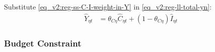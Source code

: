 \documentclass[../thesis.tex]{subfiles}
\begin{document}
Substitute \ref{eq_v2:reg-ss-C-I-weight-in-Y} in \ref{eq_v2:reg-ll-total-yn}:
\begin{align}
	\hat{Y}_{\eta t} &= \theta_{C\eta} \hat{C}_{\eta t} + (1 - \theta_{C\eta}) \hat{I}_{\eta t} \label{eq_v2:reg-ll-total-yn-2}
\end{align}

\begin{comment}
	Log-linearize \ref{eq_v2:reg-regional-demand} and then substitute \ref{eq_v2:reg-total-expense-level-2-ll}:
	\begin{align}
		P_{\eta t} Y_{\eta t} &= Q_{\eta t} C_{\eta t} + B_{\eta t} \tag{\ref{eq_v2:reg-regional-demand}} \implies \\
		\hat{P}_{\eta t} + \hat{Y}_{\eta t} &= \frac{Q_{\eta} C_{\eta}}{P_{\eta} Y_{\eta}} (\hat{Q}_{1t} + \hat{C}_{\eta t}) + \frac{B_{\eta}}{P_{\eta} Y_{\eta}} \hat{B}_{\eta t} \label{eq_v2:reg-regional-demand-ll}
	\end{align}
	
	
	Define bond and consumption weights on total expenses as $\langle \begin{matrix} \theta_{B \eta} & (1-\theta_{B \eta}) \end{matrix} \rangle$:
	\begin{align}
		\left\langle \begin{matrix} \theta_{B \eta} & (1-\theta_{B \eta}) \end{matrix} \right\rangle \coloneq \left\langle \begin{matrix} \frac{B_{\eta}}{P_{\eta} Y_{\eta}} & \frac{Q_{\eta} C_{\eta}}{P_{\eta} Y_{\eta}} \end{matrix} \right\rangle \label{eq_v2:reg-ss-Q-weight-in-Y} \end{align}
	
	
	Substitute \ref{eq_v2:reg-ss-Q-weight-in-Y} in \ref{eq_v2:reg-regional-demand-ll}:
	\begin{align}
		\hat{P}_{\eta t} + \hat{Y}_{\eta t} &= \theta_{B\eta} (\hat{Q}_{1t} + \hat{C}_{\eta t}) + (1-\theta_{B\eta}) \hat{B}_{\eta t} \label{eq_v2:reg-regional-demand-ll-2}
	\end{align}
\end{comment}


\subsubsection*{Budget Constraint}
\end{document}
